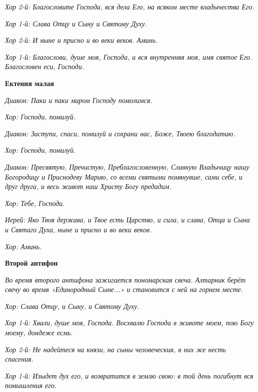 \itshape Хор 2-й:\normalfont{} Благословите Господа, вся дела Его, на всяком месте владычества Его.


\itshape Хор 1-й:\normalfont{} Слава Отцу и Сыну и Святому Духу.


\itshape Хор 2-й:\normalfont{} И ныне и присно и во веки веков. Аминь.


\itshape Хор 1-й:\normalfont{} Благослови, душе моя, Господа, и вся внутренняя моя, имя святое Его. Благословен еси, Господи.





\bfseries Ектения малая\normalfont{}


\itshape Диакон:\normalfont{} Паки и паки миром Господу помолимся.


\itshape Хор:\normalfont{} Господи, помилуй.


\itshape Диакон:\normalfont{} Заступи, спаси, помилуй и сохрани нас, Боже, Твоею благодатию.


\itshape Хор:\normalfont{} Господи, помилуй.


\itshape Диакон:\normalfont{} Пресвятую, Пречистую, Преблагословенную, Славную Владычицу нашу Богородицу и Приснодеву Марию, со всеми святыми помянувше, сами себе, и друг друга, и весь живот наш Христу Богу предадим.


\itshape Хор:\normalfont{} Тебе, Господи.


\itshape Иерей:\normalfont{} Яко Твоя держава, и Твое есть Царство, и сила, и слава, Отца и Сына и Святаго Духа, ныне и присно и во веки веков.


\itshape Хор:\normalfont{} Аминь.





\bfseries Второй антифон\normalfont{}


\itshape Во время второго антифона зажигается пономарская свеча. Алтарник берёт свечу во время «Единородный Сыне...» и становится с ней на горнем месте.\normalfont{}


\itshape Хор:\normalfont{} Слава Отцу, и Сыну, и Святому Духу.


\itshape Хор 1-й:\normalfont{} Хвали, душе моя, Господа. Восхвалю Господа в животе моем, пою Богу моему, дондеже есмь.


\itshape Хор 2-й:\normalfont{} Не надейтеся на князи, на сыны человеческия, в них же несть спасения.


\itshape Хор 1-й:\normalfont{} Изыдет дух его, и возвратится в землю свою: в той день погибнут вся помышления его.


